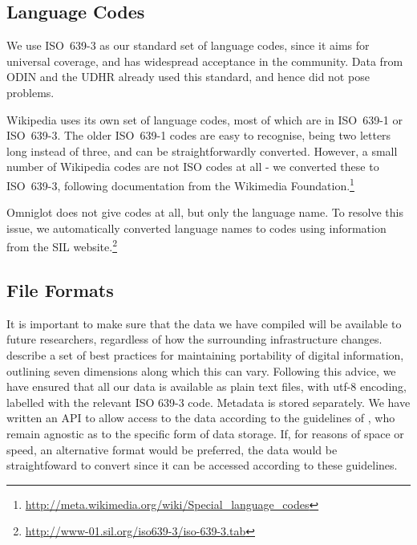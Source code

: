 


\subsection{Language Codes}
We use ISO~639-3 as our standard set of language codes, since it aims for universal coverage, and has widespread acceptance in the community. %
Data from ODIN and the UDHR already used this standard, and hence did not pose problems.

Wikipedia uses its own set of language codes, most of which are in ISO~639-1 or ISO~639-3.  The older ISO~639-1 codes are easy to recognise, being two letters long instead of three, and can be straightforwardly converted.  However, a small number of Wikipedia codes are not ISO codes at all - we converted these to ISO~639-3, following documentation from the Wikimedia Foundation.\footnote{\url{http://meta.wikimedia.org/wiki/Special_language_codes}}

Omniglot does not give codes at all, but only the language name. To resolve this issue, we automatically converted language names to codes using information from the SIL website.\footnote{\url{http://www-01.sil.org/iso639-3/iso-639-3.tab}}



\subsection{File Formats}

It is important to make sure that the data we have compiled will be available to future researchers, regardless of how the surrounding infrastructure changes.  describe a set of best practices for maintaining portability of digital information, outlining seven dimensions along which this can vary. Following this advice, we have ensured that all our data is available as plain text files, with utf-8 encoding, labelled with the relevant ISO 639-3 code. Metadata is stored separately. We have written an API to allow access to the data according to the guidelines of , who remain agnostic as to the specific form of data storage. If, for reasons of space or speed, an alternative format would be preferred, the data would be straightfoward to convert since it can be accessed according to these guidelines.
